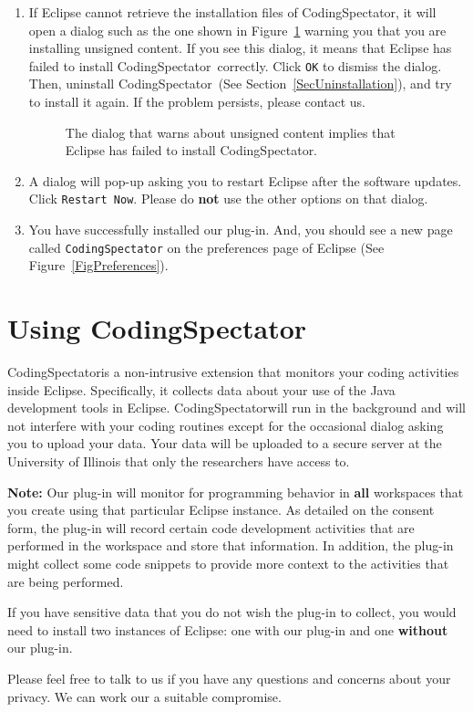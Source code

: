 \documentclass{article}
\newcommand{\fig}[1]{\imgsrc{#1.png}}
\newcommand\fig[1]{\texttt{[image: \#1]}}%
\newcommand\codspec{CodingSpectator}
\newcommand\infonote[1]{\textbf{Note: }#1}
\newcommand\uiref[1]{\texttt{#1}}
\begin{document}
\begin{enumerate}
\item If Eclipse cannot retrieve the installation files of \codspec, it will
open a dialog such as the one shown in Figure~\ref{FigUnsignedWarning} warning
you that you are installing unsigned content. If you see this dialog, it means
that Eclipse has failed to install \codspec\ correctly. Click \uiref{OK} to
dismiss the dialog. Then, uninstall \codspec\ (See
Section~\ref{SecUninstallation}), and try to install it again. If the problem
persists, please contact us.

\begin{figure}[h]
%
\centering
%
\fig{figs/warning}
%
\caption{\label{FigUnsignedWarning}The dialog that warns about unsigned content
implies that Eclipse has failed to install \codspec.}
%
\end{figure}

\item A dialog will pop-up asking you to restart Eclipse after the software
updates. Click \uiref{Restart Now}. Please do \textbf{not} use the other options
on that dialog.

\item You have successfully installed our plug-in. And, you should see a new
page called \uiref{\codspec} on the preferences page of Eclipse (See
Figure~\ref{FigPreferences}).
%
\end{enumerate}
%
\section{Using \codspec}
%
\codspec is a non-intrusive extension that monitors your coding activities
inside Eclipse. Specifically, it collects data about your use of the Java
development tools in Eclipse. \codspec will run in the background and will not
interfere with your coding routines except for the occasional dialog asking you
to upload your data. Your data will be uploaded to a secure server at the
University of Illinois that only the researchers have access to.

\infonote{Our plug-in will monitor for programming behavior in \textbf{all}
workspaces that you create using that particular Eclipse instance. As detailed
on the consent form, the plug-in will record certain code development activities
that are performed in the workspace and store that information. In addition, the
plug-in might collect some code snippets to provide more context to the
activities that are being performed.

If you have sensitive data that you do not wish the plug-in to collect, you
would need to install two instances of Eclipse: one with our plug-in and one
\textbf{without} our plug-in.

Please feel free to talk to us if you have any questions and concerns about your
privacy. We can work our a suitable compromise.}
%
\end{document}

